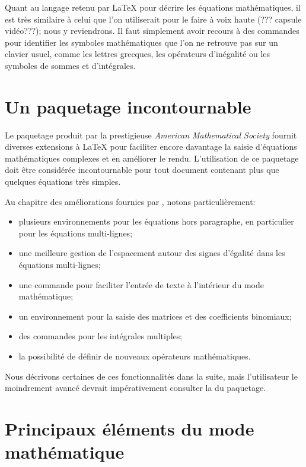 Quant au langage retenu par {\LaTeX} pour décrire les équations
mathématiques, il est très similaire à celui que l'on utiliserait pour
le faire à voix haute (??? capsule vidéo???); nous y reviendrons. Il faut simplement avoir
recours à des commandes pour identifier les symboles mathématiques que
l'on ne retrouve pas sur un clavier usuel, comme les lettres grecques,
les opérateurs d'inégalité ou les symboles de sommes et d'intégrales.


\section{Un paquetage incontournable}
\label{sec:math:amsmath}

Le paquetage  produit par la prestigieuse \emph{American
  Mathematical Society} fournit diverses extensions à {\LaTeX} pour
faciliter encore davantage la saisie d'équations mathématiques
complexes et en améliorer le rendu. L'utilisation de ce paquetage doit
être considérée incontournable pour tout document contenant plus que
quelques équations très simples.

Au chapitre des améliorations fournies par , notons
particulièrement:
\begin{itemize}
\item plusieurs environnements pour les équations hors paragraphe, en
  particulier pour les équations multi-lignes;
\item une meilleure gestion de l'espacement autour des signes
  d'égalité dans les équations multi-lignes;
\item une commande pour faciliter l'entrée de texte à l'intérieur du
  mode mathématique;
\item un environnement pour la saisie des matrices et des coefficients
  binomiaux;
\item des commandes pour les intégrales multiples;
\item la possibilité de définir de nouveaux opérateurs mathématiques.
\end{itemize}
Nous décrivons certaines de ces fonctionnalités dans la suite, mais
l'utilisateur le moindrement avancé devrait impérativement consulter
la %
du paquetage.


\section{Principaux éléments du mode mathématique}
\label{sec:math:bases}

